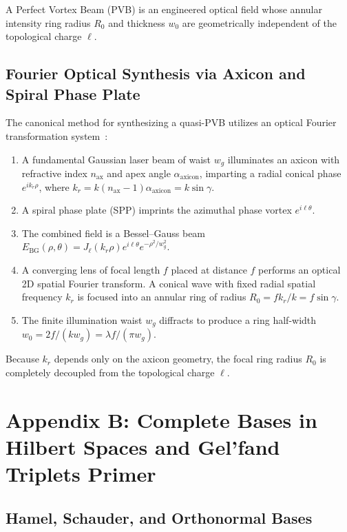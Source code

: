 \documentclass[11pt,a4paper]{article}
\begin{document}
A Perfect Vortex Beam (PVB) is an engineered optical field whose annular intensity ring radius $R_0$ and thickness $w_0$ are geometrically independent of the topological charge $\ell$.

\subsection{Fourier Optical Synthesis via Axicon and Spiral Phase Plate}

The canonical method for synthesizing a quasi-PVB utilizes an optical Fourier transformation system~\cite{Vaity2015}:
\begin{enumerate}
    \item A fundamental Gaussian laser beam of waist $w_g$ illuminates an axicon with refractive index $n_{\text{ax}}$ and apex angle $\alpha_{\text{axicon}}$, imparting a radial conical phase $e^{i k_r \rho}$, where $k_r = k (n_{\text{ax}}-1) \alpha_{\text{axicon}} = k \sin \gamma$.
    \item A spiral phase plate (SPP) imprints the azimuthal phase vortex $e^{i \ell \theta}$.
    \item The combined field is a Bessel--Gauss beam $E_{\text{BG}}(\rho, \theta) = J_\ell(k_r \rho) e^{i \ell \theta} e^{-\rho^2 / w_g^2}$.
    \item A converging lens of focal length $f$ placed at distance $f$ performs an optical 2D spatial Fourier transform. A conical wave with fixed radial spatial frequency $k_r$ is focused into an annular ring of radius $R_0 = f k_r / k = f \sin \gamma$.
    \item The finite illumination waist $w_g$ diffracts to produce a ring half-width $w_0 = 2f / (k w_g) = \lambda f / (\pi w_g)$.
\end{enumerate}

Because $k_r$ depends only on the axicon geometry, the focal ring radius $R_0$ is completely decoupled from the topological charge $\ell$.

\section{Appendix B: Complete Bases in Hilbert Spaces and Gel'fand Triplets Primer}
\label{app:hilbert}

\subsection{Hamel, Schauder, and Orthonormal Bases}
\end{document}
